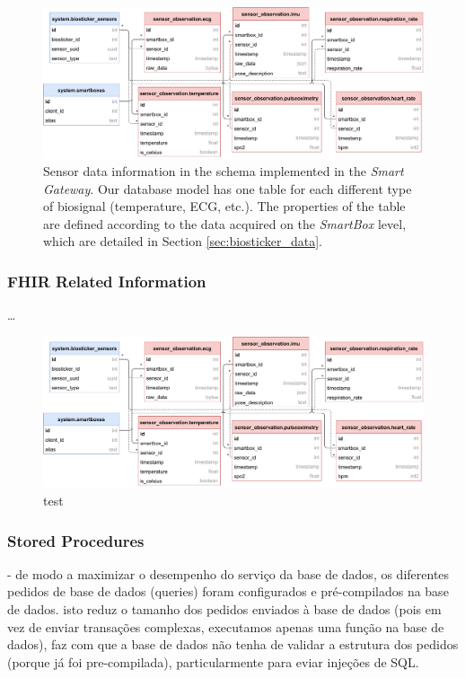 \begin{figure}[H]
    \centering
    \includegraphics[width=\linewidth]{images/database-schema-sensordata.pdf}
    \caption[Sensor data information in the schema implemented in the \textit{Smart Gateway}.]{
        Sensor data information in the schema implemented in the \textit{Smart Gateway}. Our database model has one table for each different type of biosignal (temperature, \acs{ECG}, etc.). The properties of the table are defined according to the data acquired on the \textit{SmartBox} level, which are detailed in Section \ref{sec:biosticker_data}.}
    \label{fig:wow-dbschema-sensors}
\end{figure}

\subsubsection{FHIR Related Information}
\dots 

\begin{figure}[H]
    \centering
    \includegraphics[width=\linewidth]{images/database-schema-fhir.pdf}
    \caption[test]{test}
    \label{fig:wow-dbschema-fhir}
\end{figure}
 

\subsubsection{Stored Procedures}

- de modo a maximizar o desempenho do serviço da base de dados, os diferentes pedidos de base de dados (queries) foram configurados e pré-compilados na base de dados. isto reduz o tamanho dos pedidos enviados à base de dados (pois em vez de enviar transações complexas, executamos apenas uma função na base de dados), faz com que a base de dados não tenha de validar a estrutura dos pedidos (porque já foi pre-compilada), particularmente para eviar injeções de SQL.

